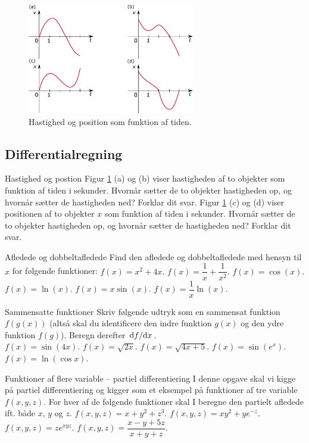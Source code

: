 \begin{figure}[]
	\centering
	\includegraphics[width=0.65\textwidth]{Matematik/matfig/vx_grafer.eps}
	\caption{Hastighed og position som funktion af tiden.}
	\label{fig:vx_grafer}
\end{figure}
\subsection*{Differentialregning}
\begin{opgave}[1]{Hastighed og postion}
	\opg Figur \ref{fig:vx_grafer} (a) og (b) viser hastigheden af to objekter som funktion af tiden i sekunder. Hvornår sætter de to objekter hastigheden op, og hvornår sætter de hastigheden ned? Forklar dit svar.
	\opg Figur \ref{fig:vx_grafer} (c) og (d) viser positionen af to objekter $x$ som funktion af tiden i sekunder. Hvornår sætter de to objekter hastigheden op, og hvornår sætter de hastigheden ned? Forklar dit svar.
\end{opgave}
\begin{opgave}[2]{Afledede og dobbeltafledede}
Find den afledede og dobbeltafledede med hensyn til $x$ for følgende funktioner:
\opg $f(x) = x^2 + 4x.$
\opg $f(x) = \dfrac{1}{x} + \dfrac{1}{x^2}.$
\opg $f(x) = \cos(x).$
\opg $f(x) = \ln(x).$
\opg $f(x) = x \sin(x).$
\opg $f(x) = \dfrac{1}{x} \ln(x).$
\end{opgave}
\begin{opgave}[2]{Sammensatte funktioner}
Skriv følgende udtryk som en sammensat funktion $f(g(x))$ (altså skal du identificere den indre funktion $g(x)$ og den ydre funktion $f(g)$). Beregn derefter $\dv*{f}{x}$.\\ 
\opg $f(x) = \sin (4x).$
\opg $f(x) = \sqrt{2x}.$
\opg $f(x) = \sqrt{4x+5}.$
\opg $f(x) = \sin(e^x).$
\opg $f(x) =  \ln \left( \cos x \right).$
\end{opgave}
\begin{opgave}[3]{Funktioner af flere variable -- partiel differentiering}
I denne opgave skal vi kigge på partiel differentiering og kigger som et eksempel på funktioner af tre variable $f(x,y,z)$. For hver af de følgende funktioner skal I beregne den partielt afledede ift. både $x$, $y$ og $z$.
\opg $f(x,y,z) = x +y^2 + z^3.$
\opg $f(x,y,z) = x y^2 +  ye^{-z}.$
\opg $f(x,y,z) = ze^{xyz}.$
\opg $f(x,y,z) = \dfrac{x-y+5z}{x+y+z}.$ \\
\end{opgave}
